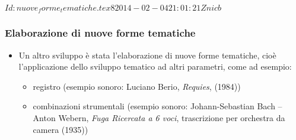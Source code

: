 %
%
\svnInfo $Id: nuove_forme_tematiche.tex 8 2014-02-04 21:01:21Z nicb $

\setcounter{ms}{0}
\begin{frame}
    \frametitle{Elaborazione di nuove forme tematiche}

    \begin{itemize}

        \item Un altro sviluppo \`e stata
            l'elaborazione di nuove forme tematiche,
            cio\`e l'applicazione dello sviluppo tematico
            ad altri parametri, come ad esempio:

            \begin{itemize}

                \item registro (esempio sonoro:
                    Luciano Berio, \emph{Requies}, (1984))

                \item combinazioni strumentali (esempio sonoro:
                    Johann-Sebastian Bach -- Anton Webern,
                    \emph{Fuga Ricercata a 6 voci},
                    trascrizione per orchestra da camera (1935))

            \end{itemize}

    \end{itemize}

\end{frame}
